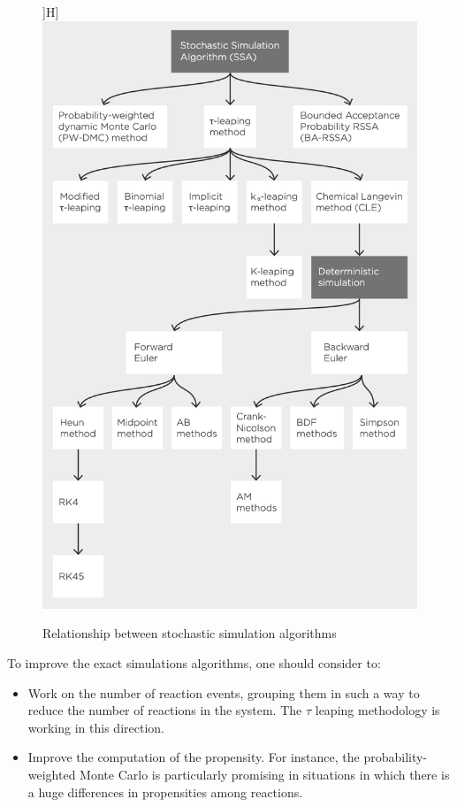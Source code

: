 \begin{figure}]H]
  \centering
  \includegraphics[width=\textwidth]{SSA_tree.png}
  \caption{Relationship between stochastic simulation algorithms}
    \label{fig:SSA_tree}
\end{figure}


To improve the exact simulations algorithms, one should consider to:

\begin{multicols}{2}
  \begin{itemize}
    \item Work on the number of reaction events, grouping them in such a way to reduce the number of reactions in the system.
      The $\tau$ leaping methodology is working in this direction.
    \item Improve the computation of the propensity.
      For instance, the probability-weighted Monte Carlo is particularly promising in situations in which there is a huge differences in propensities among reactions.
  \end{itemize}
\end{multicols}

